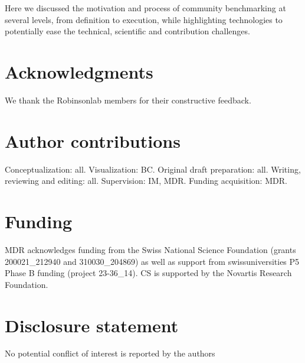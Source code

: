 \documentclass[11pt]{article}
\begin{document}
Here we discussed the motivation and process of community benchmarking at several levels, from definition to execution, while highlighting technologies to potentially ease the technical, scientific and contribution challenges. 

\hfill

\section*{Acknowledgments} 

We thank the Robinsonlab members for their constructive feedback.

\section*{Author contributions}

Conceptualization: all. Visualization: BC. Original draft preparation: all. Writing, reviewing and editing: all. Supervision: IM, MDR. Funding acquisition: MDR.

\section*{Funding}

MDR acknowledges funding from the Swiss National Science Foundation (grants 200021\_212940 and 310030\_204869) as well as support from swissuniversities P5 Phase B funding (project 23-36\_14). CS is supported by the Novartis Research Foundation.

\section*{Disclosure statement}

No potential conflict of interest is reported by the authors

\pagebreak
\linespread{1.1} 

\end{document}
